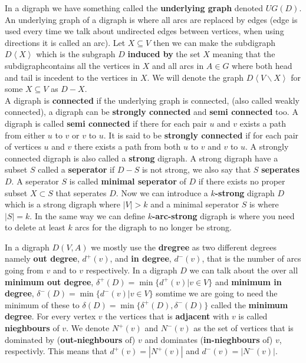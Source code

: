 In a digraph we have something called the \textbf{underlying graph} denoted $UG(D)$. 
An underlying graph of a digraph is where all arcs are replaced by edges (edge is used every time we talk about undirected edges between vertices, when using directions it is called an arc).
Let $X \subseteq V$ then we can make the subdigraph $D\left< X\right>$ which is the subgraph $D$ \textbf{induced by} the set $X$ meaning that the subdigraphcontains all the vertices in $X$ and all arcs in $A\in G$ where both head and tail is incedent to the vertices in $X$. 
We will denote the graph $D\left< V\backslash X\right>$ for some $X\subseteq V$ as $D-X$.\\
A digraph is \textbf{connected} if the underlying graph is connected, (also called weakly connected), a digraph can be \textbf{strongly connected} and \textbf{semi connected} too.
A digraph is called \textbf{semi connected} if there for each pair $u$ and $v$ exists a path from either $u$ to $v$ or $v$ to $u$.  
It is said to be \textbf{strongly connected} if for each pair of vertices $u$ and $v$ there exists a path from both $u$ to $v$ and $v$ to $u$. A strongly connected digraph is also called a \textbf{strong} digraph. 
A strong digraph have a subset $S$ called a \textbf{seperator} if $D-S$ is not strong, we also say that $S$ \textbf{seperates} $D$. 
A seperator $S$ is called \textbf{minimal seperator} of $D$ if there exists no proper subset $X\subset S$ that seperates $D$.
Now we can introduce a \textbf{$k$-strong} digraph $D$ which is a strong digraph where $|V|> k$ and a minimal seperator $S$ is  where $|S|= k$.
In the same way we can define $k$\textbf{-arc-strong} digraph is where you need to delete at least $k$ arcs for the digraph to no longer be strong. 

In a digraph $D(V,A)$ we mostly use the \textbf{dregree} as two different degrees namely \textbf{out degree}, $d^+(v)$, and \textbf{in degree}, $d^-(v)$, that is the number of arcs going from $v$ and to $v$ respectively. 
In a digraph $D$ we can talk about the over all \textbf{minimum out degree}, $\delta ^+(D)=\min\lbrace d^+(v)|v\in V\rbrace$ and \textbf{minimum in degree}, $\delta ^-(D)=\min\lbrace d^-(v)|v\in V\rbrace$
somtime we are going to need the minimum of these to $\delta(D)=\min \lbrace\delta ^+(D),\delta ^-(D) \rbrace$ called the \textbf{minimum degree}.
For every vertex $v$ the vertices that is \textbf{adjacent} with $v$ is called \textbf{nieghbours} of $v$.
We denote $N^+(v)$ and $N^-(v)$ as the set of vertices that is dominated by (\textbf{out-nieghbours} of) $v$ and dominates (\textbf{in-nieghbours} of) $v$, respectivly. 
This means that $d^+(v)=|N^+(v)|$ and $d^-(v)=|N^-(v)|$.\\


